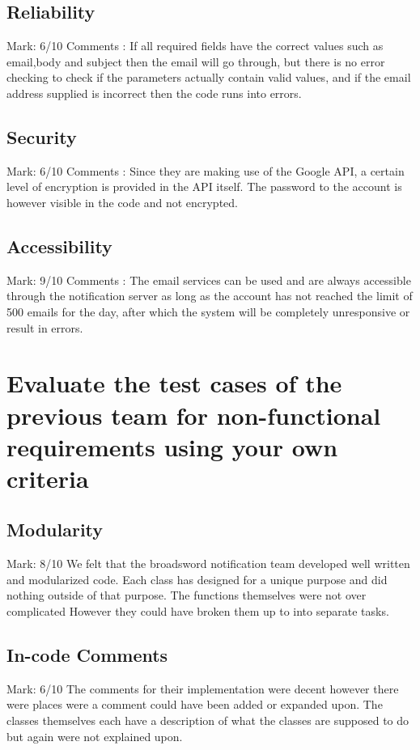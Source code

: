 \documentclass[11pt]{article}
\begin{document}
	\subsection{Reliability}
		Mark: 6/10\newline
		Comments : If all required fields have the correct values such as email,body and subject then the email will go through, but there is no error checking to check if the parameters actually contain valid values, and if the email address supplied is incorrect then the code runs into errors.
		

	\subsection{Security}
		Mark: 6/10\newline
		Comments : Since they are making use of the Google API, a certain level of encryption is provided in the API itself. The password to the account is however visible in the code and not encrypted. 
		

	\subsection{Accessibility}
		Mark: 9/10\newline
		Comments : The email services can be used and are always accessible through the notification server as long as the account has not reached the limit of 500 emails for the day, after which the system will be completely unresponsive or result in errors.
		

\section{Evaluate the test cases of the previous team for non-functional requirements using your own criteria}	
	\subsection{Modularity}
		Mark: 8/10\newline
		We felt that the broadsword notification team developed well written and modularized code. Each class has designed for a unique purpose and did nothing outside of that purpose. The functions themselves were not over complicated However they could have broken them up to into separate tasks.
		
	\subsection{In-code Comments}
		Mark: 6/10\newline 
		The comments for their implementation were decent however there were places were a comment could have been added or expanded upon. The classes themselves each have a description of what the classes are supposed to do but again were not explained upon.
		
\end{document}
